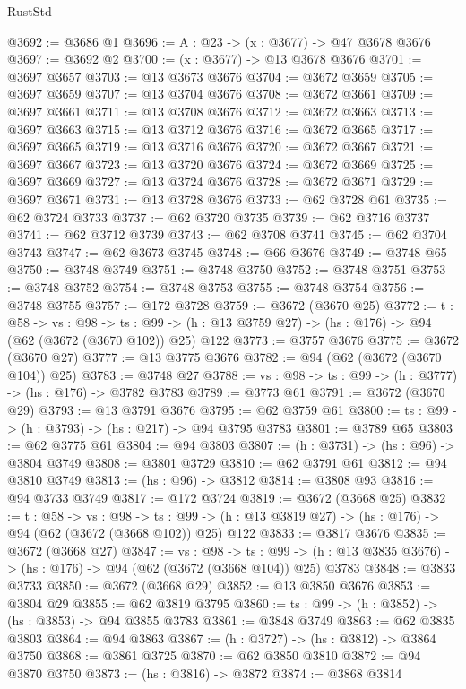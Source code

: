 \begin{lexlean}{RustStd}
\begin{coremodule}
@3692 := @3686 @1
@3696 := {A : @23} -> (x : @3677) -> @47 @3678 @3676
@3697 := @3692 @2
@3700 := (x : @3677) -> @13 @3678 @3676
@3701 := @3697 @3657
@3703 := @13 @3673 @3676
@3704 := @3672 @3659
@3705 := @3697 @3659
@3707 := @13 @3704 @3676
@3708 := @3672 @3661
@3709 := @3697 @3661
@3711 := @13 @3708 @3676
@3712 := @3672 @3663
@3713 := @3697 @3663
@3715 := @13 @3712 @3676
@3716 := @3672 @3665
@3717 := @3697 @3665
@3719 := @13 @3716 @3676
@3720 := @3672 @3667
@3721 := @3697 @3667
@3723 := @13 @3720 @3676
@3724 := @3672 @3669
@3725 := @3697 @3669
@3727 := @13 @3724 @3676
@3728 := @3672 @3671
@3729 := @3697 @3671
@3731 := @13 @3728 @3676
@3733 := @62 @3728 @61
@3735 := @62 @3724 @3733
@3737 := @62 @3720 @3735
@3739 := @62 @3716 @3737
@3741 := @62 @3712 @3739
@3743 := @62 @3708 @3741
@3745 := @62 @3704 @3743
@3747 := @62 @3673 @3745
@3748 := @66 @3676
@3749 := @3748 @65
@3750 := @3748 @3749
@3751 := @3748 @3750
@3752 := @3748 @3751
@3753 := @3748 @3752
@3754 := @3748 @3753
@3755 := @3748 @3754
@3756 := @3748 @3755
@3757 := @172 @3728
@3759 := @3672 (@3670 @25)
@3772 := {t : @58} ->
  {vs : @98} ->
  {ts : @99} -> (h : @13 @3759 @27) -> (hs : @176) -> @94 (@62 (@3672 (@3670 @102)) @25) @122
@3773 := @3757 @3676
@3775 := @3672 (@3670 @27)
@3777 := @13 @3775 @3676
@3782 := @94 (@62 (@3672 (@3670 @104)) @25)
@3783 := @3748 @27
@3788 := {vs : @98} -> {ts : @99} -> (h : @3777) -> (hs : @176) -> @3782 @3783
@3789 := @3773 @61
@3791 := @3672 (@3670 @29)
@3793 := @13 @3791 @3676
@3795 := @62 @3759 @61
@3800 := {ts : @99} -> (h : @3793) -> (hs : @217) -> @94 @3795 @3783
@3801 := @3789 @65
@3803 := @62 @3775 @61
@3804 := @94 @3803
@3807 := (h : @3731) -> (hs : @96) -> @3804 @3749
@3808 := @3801 @3729
@3810 := @62 @3791 @61
@3812 := @94 @3810 @3749
@3813 := (hs : @96) -> @3812
@3814 := @3808 @93
@3816 := @94 @3733 @3749
@3817 := @172 @3724
@3819 := @3672 (@3668 @25)
@3832 := {t : @58} ->
  {vs : @98} ->
  {ts : @99} -> (h : @13 @3819 @27) -> (hs : @176) -> @94 (@62 (@3672 (@3668 @102)) @25) @122
@3833 := @3817 @3676
@3835 := @3672 (@3668 @27)
@3847 := {vs : @98} ->
  {ts : @99} -> (h : @13 @3835 @3676) -> (hs : @176) -> @94 (@62 (@3672 (@3668 @104)) @25) @3783
@3848 := @3833 @3733
@3850 := @3672 (@3668 @29)
@3852 := @13 @3850 @3676
@3853 := @3804 @29
@3855 := @62 @3819 @3795
@3860 := {ts : @99} -> (h : @3852) -> (hs : @3853) -> @94 @3855 @3783
@3861 := @3848 @3749
@3863 := @62 @3835 @3803
@3864 := @94 @3863
@3867 := (h : @3727) -> (hs : @3812) -> @3864 @3750
@3868 := @3861 @3725
@3870 := @62 @3850 @3810
@3872 := @94 @3870 @3750
@3873 := (hs : @3816) -> @3872
@3874 := @3868 @3814

\end{coremodule}
\end{lexlean}
